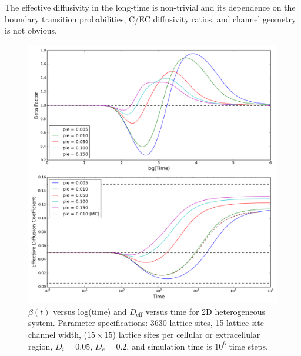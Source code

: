 	The effective diffusivity in the long-time is non-trivial and its dependence on the boundary transition probabilities, C/EC diffusivity ratios, and channel geometry is not obvious.
	
	\begin{figure}[h!]
		\centering
		\includegraphics[width=1.0\linewidth]{../images/2D/pie_beta_deff_2D}
		\caption{$ \beta (t) $ versus log(time) and $ D_\textrm{eff} $ versus time for 2D heterogeneous system. Parameter specifications: 3630 lattice sites, 15 lattice site channel width, ($ 15 \times 15 $) lattice sites per cellular or extracellular region, $ D_i = 0.05 $, $ D_e = 0.2 $, and simulation time is $ 10^6 $ time steps.}
		\label{fig:pie_beta_deff_2D}
	\end{figure}

\clearpage
